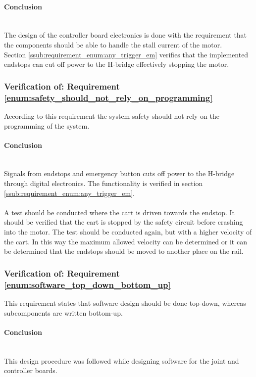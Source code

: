 \paragraph{Conclusion}~\\
The design of the controller board electronics is done with the requirement that the components should be able to handle the stall current of the motor.
\\
Section \ref{ssub:requirement_enum:any_trigger_em} verifies that the implemented endstops can cut off power to the H-bridge effectively stopping the motor.

\subsubsection{Verification of: Requirement \ref{enum:safety_should_not_rely_on_programming}} %
\label{sub:verification_of_requirement_enum:safety_should_not_rely_on_programming}
According to this requirement the system safety should not rely on the programming of the system.

\paragraph{Conclusion}~\\
Signals from endstops and emergency button cuts off power to the H-bridge through digital electronics.
The functionality is verified in section \ref{ssub:requirement_enum:any_trigger_em}.
\\~\\
A test should be conducted where the cart is driven towards the endstop.
It should be verified that the cart is stopped by the safety circuit before crashing into the motor.
The test should be conducted again, but with a higher velocity of the cart.
In this way the maximum allowed velocity can be determined or it can be determined that the endstops should be moved to another place on the rail.

\subsubsection{Verification of: Requirement \ref{enum:software_top_down_bottom_up}} %
\label{sub:verification_of_requirement_enum:software_top_down_bottom_up}
This requirement states that software design should be done top-down, whereas subcomponents are written bottom-up.

\paragraph{Conclusion}~\\
This design procedure was followed while designing software for the joint and controller boards.